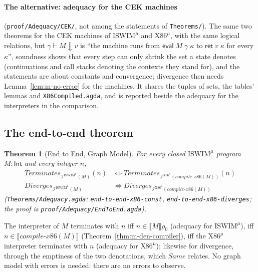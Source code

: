 \documentclass[10pt]{article}
\theoremstyle{acmplain}
\newtheorem{theorem}{Theorem}[section]
\newcommand{\SEM}[1]{\llbracket #1 \rrbracket}
\newcommand{\key}[1]{\mathsf{#1}}
\newcommand{\pass}[1]{\mathit{#1}}
\newcommand{\ev}[3]{\key{eval}\;#1\;#2\;#3}
\newcommand{\rt}[2]{\key{ret}\;#1\;#2}
\newcommand{\Term}{\mathit{Terminates}}
\newcommand{\Div}{\mathit{Diverges}}
\newcommand{\Interp}[1]{\mathcal{I}^{#1}}
\newcommand{\Same}{\mathit{Same}}
\newcommand{\Ml}[1]{\textrm{#1}^{\mu}}                  %
\begin{document}
\paragraph{The alternative: adequacy for the CEK machines}
(\texttt{proof/Adequacy/CEK/}, not among the statements of
\texttt{Theorems/}). The same two theorems for the CEK machines of
$\Ml{ISWIM}$ and $\Ml{X86}$, with the same logical relations, but
$\gamma \vdash M \Downarrow v$ is ``the machine runs from $\ev{M}{\gamma}{\kappa}$
to $\rt{v}{\kappa}$ for every $\kappa$'', soundness shows that every step can
only shrink the set a state denotes (continuations and call stacks
denoting the contexts they stand for), and the statements are about
constants and convergence; divergence then needs
Lemma~\ref{lem:m-no-error} for the machines. It shares the tuples of
sets, the tables' lemmas and \texttt{X86Compiled.agda}, and is reported
beside the adequacy for the interpreters in the comparison.

\subsection{The end-to-end theorem}

\begin{theorem}[End to End, Graph Model]\label{thm:m-end-to-end-den}\sloppy
For every closed $\Ml{ISWIM}$ program $M : \key{Int}$ and every integer $n$,
\begin{align*}
  \Term_{\Interp{\Ml{ISWIM}}(M)}(n) &\iff \Term_{\Interp{\Ml{X86}}(\pass{compile\text{-}x86}(M))}(n) \\
  \Div_{\Interp{\Ml{ISWIM}}(M)} &\iff \Div_{\Interp{\Ml{X86}}(\pass{compile\text{-}x86}(M))}
\end{align*}
(\texttt{Theorems/\allowbreak Adequacy.agda}: \texttt{end-to-end-x86-const},
\texttt{end-to-end-x86-diverges}; the proof is
\texttt{proof/Adequacy/EndToEnd.agda}).
\end{theorem}
The interpreter of $M$ terminates with $n$ iff $n \in \SEM{M}\rho_0$
(adequacy for $\Ml{ISWIM}$), iff $n \in \SEM{\pass{compile\text{-}x86}(M)}$
(Theorem~\ref{thm:m-den-compiler}), iff the $\Ml{X86}$ interpreter terminates
with $n$ (adequacy for $\Ml{X86}$); likewise for divergence, through the
emptiness of the two denotations, which $\Same$ relates. No graph model
with errors is needed: there are no errors to observe.
\end{document}
